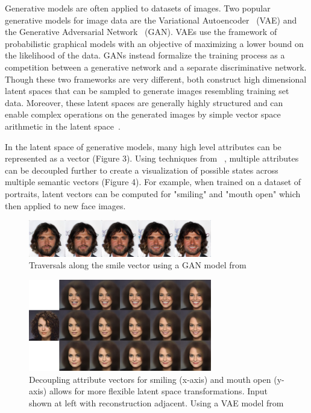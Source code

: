 \documentclass[letterpaper]{article}
\begin{document}
Generative models are often applied to datasets of images. Two popular generative models for image data are the Variational Autoencoder~\cite{kingma13} (VAE) and the Generative Adversarial Network~\cite{goodfellow14} (GAN). VAEs use the framework of probabilistic graphical models with an objective of maximizing a lower bound on the likelihood of the data. GANs instead formalize the training process as a competition between a generative network and a separate discriminative network. Though these two frameworks are very different, both construct high dimensional latent spaces that can be sampled to generate images resembling training set data. Moreover, these latent spaces are generally highly structured and can enable complex operations on the generated images by simple vector space arithmetic in the latent space~\cite{larsen15}.

In the latent space of generative models, many high level attributes can be represented as a vector (Figure 3). Using techniques from ~\cite{white16}, multiple attributes can be decoupled further to create a visualization of possible states across multiple semantic vectors (Figure 4). For example, when trained on a dataset of portraits, latent vectors can be computed for "smiling" and "mouth open" which then applied to new face images.

\begin{figure}[ht]
  \centering
  \includegraphics[width=8cm]{figs/smilevector.png}
  \caption{Traversals along the smile vector using a GAN model from ~\cite{dumoulin16}}
\end{figure}

\begin{figure}[ht]
  \centering
  \includegraphics[width=8cm]{figs/decoupled.jpg}
  \caption{Decoupling attribute vectors for smiling (x-axis) and mouth open (y-axis) allows for more flexible latent space transformations. Input shown at left with reconstruction adjacent. Using a VAE model from ~\cite{lamb16}}
\end{figure}
\end{document}
